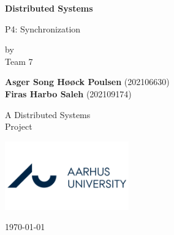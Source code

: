 \newcommand{\norm}[1]{\left\lVert#1\right\rVert}     
\newcommand\course{Distributed Systems}        %
\newcommand\hwnumber{4}                                   %
\newcommand\Information{XXX/xxxxxxxx}                     %
\begin{titlepage}
    \begin{center}
        \vspace*{3cm}
            
        \Huge
        \textbf{\course{}}
            
        \vspace{1cm}
        \huge
        P\hwnumber : Synchronization
            
        \vspace{1.5cm}
        \Large
        by\\
        Team 7
        
        \textbf{Asger Song Høøck Poulsen} (202106630)\\%
        \textbf{Firas Harbo Saleh} (202109174) %
        
            
        \vfill
        
        A \course{} \\Project
            
        \vspace{0.5cm}
            
        \includegraphics[width=0.4\textwidth]{img/aarhus-university.png}
        \\
        
        \Large
        
        \today
            
    \end{center}
\end{titlepage}